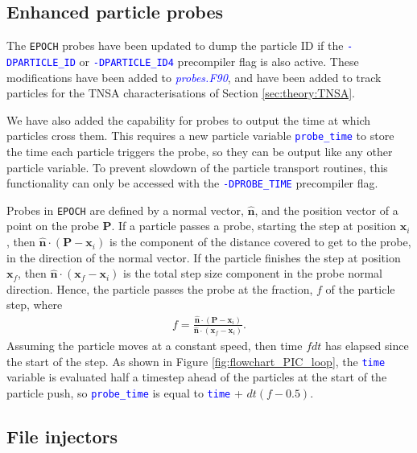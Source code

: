 \documentclass[12pt]{article}
\numberwithin{equation}{section}
\begin{document}
\subsection{Enhanced particle probes} \label{sec:code:probes} 

The \texttt{EPOCH} probes have been updated to dump the particle ID if the \textcolor{blue}{\texttt{-DPARTICLE\_ID}} or \textcolor{blue}{\texttt{-DPARTICLE\_ID4}} precompiler flag is also active. These modifications have been added to \textcolor{blue}{\textit{probes.F90}}, and have been added to track particles for the TNSA characterisations of Section \ref{sec:theory:TNSA}. 

We have also added the capability for probes to output the time at which particles cross them. This requires a new particle variable \textcolor{blue}{\texttt{probe\_time}} to store the time each particle triggers the probe, so they can be output like any other particle variable. To prevent slowdown of the particle transport routines, this functionality can only be accessed with the \textcolor{blue}{\texttt{-DPROBE\_TIME}} precompiler flag. 

Probes in \texttt{EPOCH} are defined by a normal vector, $\pmb{\hat{n}}$, and the position vector of a point on the probe $\pmb{P}$. If a particle passes a probe, starting the step at position $\pmb{x}_i$, then $\pmb{\hat{n}}\cdot (\pmb{P}-{\pmb{x}_i} )$ is the component of the distance covered to get to the probe, in the direction of the normal vector. If the particle finishes the step at position $\pmb{x}_f$, then $\pmb{\hat{n}}\cdot (\pmb{x}_f-\pmb{x}_i)$ is the total step size component in the probe normal direction. Hence, the particle passes the probe at the fraction, $f$ of the particle step, where
%
\begin{align}
  f = \frac{\pmb{\hat{n}}\cdot (\pmb{P}-\pmb{x}_i )}{\pmb{\hat{n}}\cdot (\pmb{x}_f-\pmb{x}_i)}.
\end{align}
%
Assuming the particle moves at a constant speed, then time $fdt$ has elapsed since the start of the step. As shown in Figure \ref{fig:flowchart_PIC_loop}, the \textcolor{blue}{\texttt{time}} variable is evaluated half a timestep ahead of the particles at the start of the particle push, so \textcolor{blue}{\texttt{probe\_time}} is equal to \textcolor{blue}{\texttt{time}} + $dt(f-0.5)$.

\subsection{File injectors} \label{sec:code:file}
\end{document}
